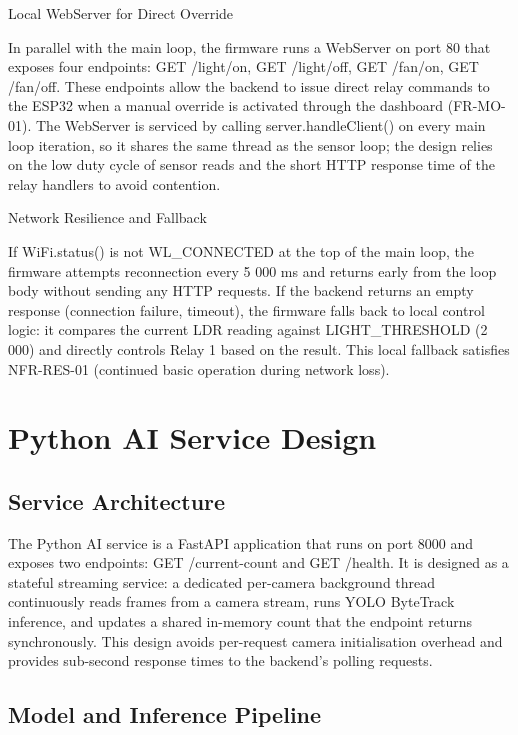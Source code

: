 Local WebServer for Direct Override

In parallel with the main loop, the firmware runs a WebServer on port 80 that exposes
four endpoints: GET /light/on, GET /light/off, GET /fan/on, GET /fan/off. These endpoints
allow the backend to issue direct relay commands to the ESP32 when a manual override
is activated through the dashboard (FR-MO-01). The WebServer is serviced by calling
server.handleClient() on every main loop iteration, so it shares the same thread as the
sensor loop; the design relies on the low duty cycle of sensor reads and the short HTTP
response time of the relay handlers to avoid contention.

Network Resilience and Fallback

If WiFi.status() is not WL_CONNECTED at the top of the main loop, the firmware attempts
reconnection every 5 000 ms and returns early from the loop body without sending any
HTTP requests. If the backend returns an empty response (connection failure, timeout),
the firmware falls back to local control logic: it compares the current LDR reading
against LIGHT_THRESHOLD (2 000) and directly controls Relay 1 based on the result. This
local fallback satisfies NFR-RES-01 (continued basic operation during network loss).


\section{Python AI Service Design}


\subsection{Service Architecture}


The Python AI service is a FastAPI application that runs on port 8000 and exposes two
endpoints: GET /current-count and GET /health. It is designed as a stateful streaming
service: a dedicated per-camera background thread continuously reads frames from a
camera stream, runs YOLO ByteTrack inference, and updates a shared in-memory count
that the endpoint returns synchronously. This design avoids per-request camera
initialisation overhead and provides sub-second response times to the backend's polling
requests.

\subsection{Model and Inference Pipeline}


